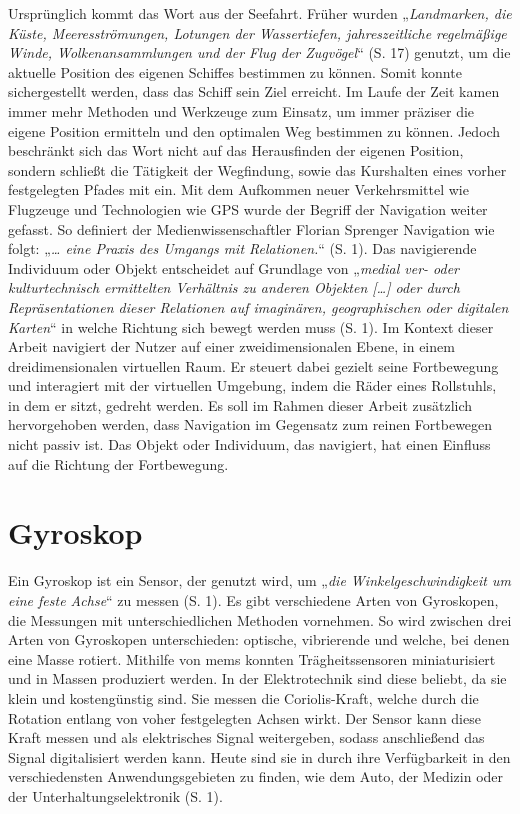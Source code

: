 Ursprünglich kommt das Wort aus der Seefahrt.
Früher wurden „\textit{Landmarken, die Küste, Meeresströmungen, Lotungen der Wassertiefen, jahreszeitliche regelmäßige Winde, Wolkenansammlungen und der Flug der Zugvögel}“ (S. 17)\cite{wolfschmidtNavigareNecesseEst2008} genutzt, um die aktuelle Position des eigenen Schiffes bestimmen zu können.
Somit konnte sichergestellt werden, dass das Schiff sein Ziel erreicht.
Im Laufe der Zeit kamen immer mehr Methoden und Werkzeuge zum Einsatz, um immer präziser die eigene Position ermitteln und den optimalen Weg bestimmen zu können.
Jedoch beschränkt sich das Wort nicht auf das Herausfinden der eigenen Position, sondern schließt die Tätigkeit der Wegfindung, sowie das Kurshalten eines vorher festgelegten Pfades mit ein.
Mit dem Aufkommen neuer Verkehrsmittel wie Flugzeuge und Technologien wie GPS wurde der Begriff der Navigation weiter gefasst.
So definiert der Medienwissenschaftler Florian Sprenger Navigation wie folgt: „\textit{… eine Praxis des Umgangs mit Relationen.}“ (S. 1)\cite{sprengerNavigationenUndRelationen2022}.
Das navigierende Individuum oder Objekt entscheidet auf Grundlage von „\textit{medial ver- oder kulturtechnisch ermittelten Verhältnis zu anderen Objekten […] oder durch Repräsentationen dieser Relationen auf imaginären, geographischen oder digitalen Karten}“ in welche Richtung sich bewegt werden muss (S. 1)\cite{sprengerNavigationenUndRelationen2022}.
Im Kontext dieser Arbeit navigiert der Nutzer auf einer zweidimensionalen Ebene, in einem dreidimensionalen virtuellen Raum.
Er steuert dabei gezielt seine Fortbewegung und interagiert mit der virtuellen Umgebung, indem die Räder eines Rollstuhls, in dem er sitzt, gedreht werden.
Es soll im Rahmen dieser Arbeit zusätzlich hervorgehoben werden, dass Navigation im Gegensatz zum reinen Fortbewegen nicht passiv ist.
Das Objekt oder Individuum, das navigiert, hat einen Einfluss auf die Richtung der Fortbewegung.

\section{Gyroskop}
Ein Gyroskop ist ein Sensor, der genutzt wird, um „\textit{die Winkelgeschwindigkeit um eine feste Achse}“ zu messen (S. 1)\cite{armeniseAdvancesGyroscopeTechnologies2010}.
Es gibt verschiedene Arten von Gyroskopen, die Messungen mit unterschiedlichen Methoden vornehmen.
So wird zwischen drei Arten von Gyroskopen unterschieden: optische, vibrierende und welche, bei denen eine Masse rotiert.
Mithilfe von \ac{mems} konnten Trägheitssensoren miniaturisiert und in Massen produziert werden.
In der Elektrotechnik sind diese beliebt, da sie klein und kostengünstig sind\cite{maenakaMEMSInertialSensors2008}.
Sie messen die Coriolis-Kraft, welche durch die Rotation entlang von voher festgelegten Achsen wirkt.
Der Sensor kann diese Kraft messen und als elektrisches Signal weitergeben, sodass anschließend das Signal digitalisiert werden kann\cite{utmelMPU6050ModuleDatasheet}.
Heute sind sie in durch ihre Verfügbarkeit in den verschiedensten Anwendungsgebieten zu finden, wie dem Auto, der Medizin oder der Unterhaltungselektronik (S. 1)\cite{armeniseAdvancesGyroscopeTechnologies2010}.

